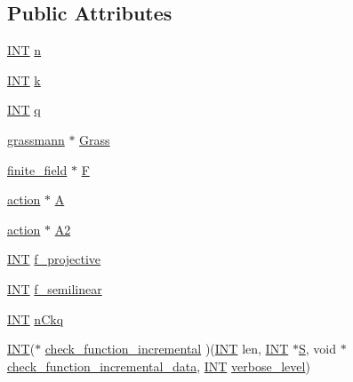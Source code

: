 \subsection*{Public Attributes}
\begin{DoxyCompactItemize}
\item 
\mbox{\hyperlink{galois_8h_a09fddde158a3a20bd2dcadb609de11dc}{I\+NT}} \mbox{\hyperlink{classrecoordinatize_a66f2e404660a832d6bb41a7db3f04d0b}{n}}
\item 
\mbox{\hyperlink{galois_8h_a09fddde158a3a20bd2dcadb609de11dc}{I\+NT}} \mbox{\hyperlink{classrecoordinatize_a11e589b124f4ce5fa81019ac2cb34e54}{k}}
\item 
\mbox{\hyperlink{galois_8h_a09fddde158a3a20bd2dcadb609de11dc}{I\+NT}} \mbox{\hyperlink{classrecoordinatize_a411e94c36548c5b65fde9f255eb7c564}{q}}
\item 
\mbox{\hyperlink{classgrassmann}{grassmann}} $\ast$ \mbox{\hyperlink{classrecoordinatize_aba1ff907c0ca8f0dae8a92e899da87d9}{Grass}}
\item 
\mbox{\hyperlink{classfinite__field}{finite\+\_\+field}} $\ast$ \mbox{\hyperlink{classrecoordinatize_a7c80bdb5ce471ec0d6b674c6066210a6}{F}}
\item 
\mbox{\hyperlink{classaction}{action}} $\ast$ \mbox{\hyperlink{classrecoordinatize_ad68c7a09b50796df51135e032bc048f6}{A}}
\item 
\mbox{\hyperlink{classaction}{action}} $\ast$ \mbox{\hyperlink{classrecoordinatize_a56e47746603335e7e9c0394913c6d673}{A2}}
\item 
\mbox{\hyperlink{galois_8h_a09fddde158a3a20bd2dcadb609de11dc}{I\+NT}} \mbox{\hyperlink{classrecoordinatize_a81e2a23f6eed7edc0c192f600273e601}{f\+\_\+projective}}
\item 
\mbox{\hyperlink{galois_8h_a09fddde158a3a20bd2dcadb609de11dc}{I\+NT}} \mbox{\hyperlink{classrecoordinatize_a1fe3905f35316f512da66bb635f84df3}{f\+\_\+semilinear}}
\item 
\mbox{\hyperlink{galois_8h_a09fddde158a3a20bd2dcadb609de11dc}{I\+NT}} \mbox{\hyperlink{classrecoordinatize_adff12426f7a440cc9cd539d7fab9ae03}{n\+Ckq}}
\item 
\mbox{\hyperlink{galois_8h_a09fddde158a3a20bd2dcadb609de11dc}{I\+NT}}($\ast$ \mbox{\hyperlink{classrecoordinatize_a994ef4e40c05d5994ac7316df7c3a52b}{check\+\_\+function\+\_\+incremental}} )(\mbox{\hyperlink{galois_8h_a09fddde158a3a20bd2dcadb609de11dc}{I\+NT}} len, \mbox{\hyperlink{galois_8h_a09fddde158a3a20bd2dcadb609de11dc}{I\+NT}} $\ast$\mbox{\hyperlink{simeon_8_c_adab47f8243f1b5a2c31df2535d6b37d0}{S}}, void $\ast$\mbox{\hyperlink{classrecoordinatize_acbac3a8d02e4356dcaa0c0af45180ed5}{check\+\_\+function\+\_\+incremental\+\_\+data}}, \mbox{\hyperlink{galois_8h_a09fddde158a3a20bd2dcadb609de11dc}{I\+NT}} \mbox{\hyperlink{simeon_8_c_a818073fbcc2f439e7c56952f67386122}{verbose\+\_\+level}})

\end{DoxyCompactItemize}
